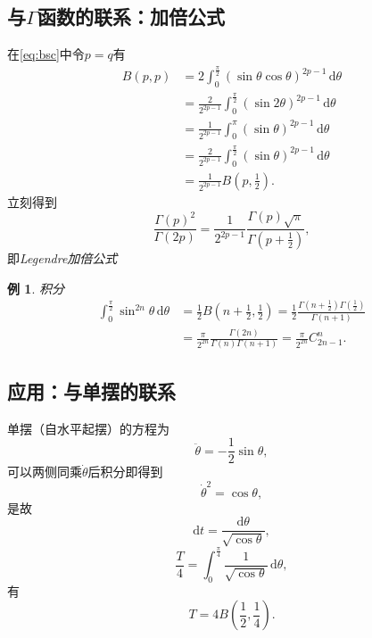 \documentclass[UTF-8]{ctexart}
\newcommand{\notion}{\emph}
\newcommand{\dr}{\mathrm{d}}
\newcommand{\pare}[1]{\left(#1\right)}
\newcommand{\half}{\frac{1}{2}}
\newcommand{\intu}[3]{\int_0^{#1} #2 \, \dr #3}
\newtheorem{reflection}{反射}
\newcommand{\refl}[1]{\vspace{0.5em}\par\noindent\fbox{%
    \parbox{\textwidth}{%
    \begin{reflection}
        #1
    \end{reflection}
    }%
}\vspace{0.5em}\par}
\newtheorem{ex}{例}
\begin{document}
  \subsection{与$\Gamma$函数的联系：加倍公式}
  在\ref{eq:bsc}中令$p=q$有
  \begin{align*}
    B\pare{p,p} &= 2 \intu{\frac{\pi}{2}}{\pare{\sin\theta\cos\theta}^{2p-1}}{\theta} \\
    &= \frac{2}{2^{2p-1}}\intu{\frac{\pi}{2}}{\pare{\sin2\theta}^{2p-1}}{\theta} \\
    &= \frac{1}{2^{2p-1}}\intu{\pi}{\pare{\sin\theta}^{2p-1}}{\theta} \\
    &= \frac{2}{2^{2p-1}}\intu{\frac{\pi}{2}}{\pare{\sin\theta}^{2p-1}}{\theta} \\
    &=\frac{1}{2^{2p-1}}B\pare{p,\frac{1}{2}}.
  \end{align*}
  立刻得到
  \[ \frac{\Gamma\pare{p}^2}{\Gamma\pare{2p}} = \frac{1}{2^{2p-1}}\frac{\Gamma\pare{p}\sqrt{\pi}}{\Gamma\pare{p+\half}}, \]
  即\notion{Legendre加倍公式}
  \refl{
  \label{refl:gamma2p}
  \[ \Gamma\pare{2p} = \frac{2^{2p-1}}{\sqrt{\pi}}\Gamma\pare{p}\Gamma\pare{p+\half}. \]}
  \begin{ex}
  \label{ex:sin2n}
  积分
  \begin{align*}
   \intu{\frac{\pi}{2}}{\sin^{2n}\theta}{\theta} &= \half B\pare{n+\half,\half} = \half\frac{\Gamma\pare{n+\half}\Gamma\pare{\half}}{\Gamma\pare{n+1}}\\
   &= \frac{\pi}{2^{2n}}\frac{\Gamma\pare{2n}}{\Gamma\pare{n}\Gamma\pare{n+1}} = \frac{\pi}{2^{2n}}C_{2n-1}^{n}.
  \end{align*}
  \end{ex}
  \subsection{应用：与单摆的联系}
  \label{sssec:gamma2pd}
  单摆（自水平起摆）的方程为
  \[ \ddot{\theta} = -\half\sin\theta, \]
  可以两侧同乘$\dot{\theta}$后积分即得到
  \[ \dot{\theta}^2 = \cos{\theta}, \]
  是故
  \[ \dr t = \frac{\dr \theta}{\sqrt{\cos\theta}}, \]
  \[ \frac{T}{4} = \intu{\frac{\pi}{4}}{\frac{1}{\sqrt{\cos\theta}}}{\theta}, \]
  有
  \[ T = 4B\pare{\half, \frac{1}{4}}. \]
\end{document}
